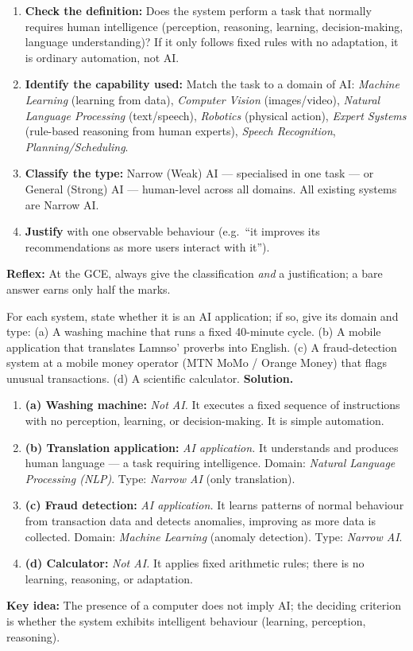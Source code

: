 \documentclass[11pt]{article}
\newcommand{\cle}[1]{{\popxbold\color{popdark}#1}}
\begin{document}
\begin{methode}
\begin{enumerate}
\item \textbf{Check the definition:} Does the system perform a task that normally requires human intelligence (perception, reasoning, learning, decision-making, language understanding)? If it only follows fixed rules with no adaptation, it is ordinary automation, not AI.
\item \textbf{Identify the capability used:} Match the task to a domain of AI: \emph{Machine Learning} (learning from data), \emph{Computer Vision} (images/video), \emph{Natural Language Processing} (text/speech), \emph{Robotics} (physical action), \emph{Expert Systems} (rule-based reasoning from human experts), \emph{Speech Recognition}, \emph{Planning/Scheduling}.
\item \textbf{Classify the type:} \cle{Narrow (Weak) AI} — specialised in one task — or \cle{General (Strong) AI} — human-level across all domains. All existing systems are Narrow AI.
\item \textbf{Justify} with one observable behaviour (e.g.\ ``it improves its recommendations as more users interact with it'').
\end{enumerate}
\textbf{Reflex:} At the GCE, always give the classification \emph{and} a justification; a bare answer earns only half the marks.
\end{methode}

\begin{exoresolu}
For each system, state whether it is an AI application; if so, give its domain and type:
(a) A washing machine that runs a fixed 40-minute cycle.
(b) A mobile application that translates Lamnso' proverbs into English.
(c) A fraud-detection system at a mobile money operator (MTN MoMo / Orange Money) that flags unusual transactions.
(d) A scientific calculator.
\tcblower
\textbf{Solution.}
\begin{enumerate}
\item \textbf{(a) Washing machine:} \emph{Not AI.} It executes a fixed sequence of instructions with no perception, learning, or decision-making. It is simple automation.
\item \textbf{(b) Translation application:} \emph{AI application.} It understands and produces human language — a task requiring intelligence. Domain: \emph{Natural Language Processing (NLP)}. Type: \emph{Narrow AI} (only translation).
\item \textbf{(c) Fraud detection:} \emph{AI application.} It learns patterns of normal behaviour from transaction data and detects anomalies, improving as more data is collected. Domain: \emph{Machine Learning} (anomaly detection). Type: \emph{Narrow AI}.
\item \textbf{(d) Calculator:} \emph{Not AI.} It applies fixed arithmetic rules; there is no learning, reasoning, or adaptation.
\end{enumerate}
\textbf{Key idea:} The presence of a computer does not imply AI; the deciding criterion is whether the system exhibits intelligent behaviour (learning, perception, reasoning).
\end{exoresolu}
\end{document}
